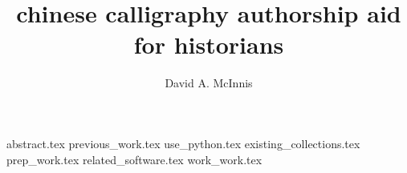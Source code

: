 \documentclass{ewuthesis}
\begin{document}
    \title{chinese calligraphy authorship aid for historians}
    \author{David A. McInnis}    
    \frontmatter
    \maketitle          %
    \makesigpage        %
    {abstract.tex}
    \mainmatter
    {previous_work.tex}
    {use_python.tex}
    {existing_collections.tex}
    {prep_work.tex}
    {related_software.tex}
    {work_work.tex}
    
    
    \newpage
    \makevita
    
    
\end{document}
